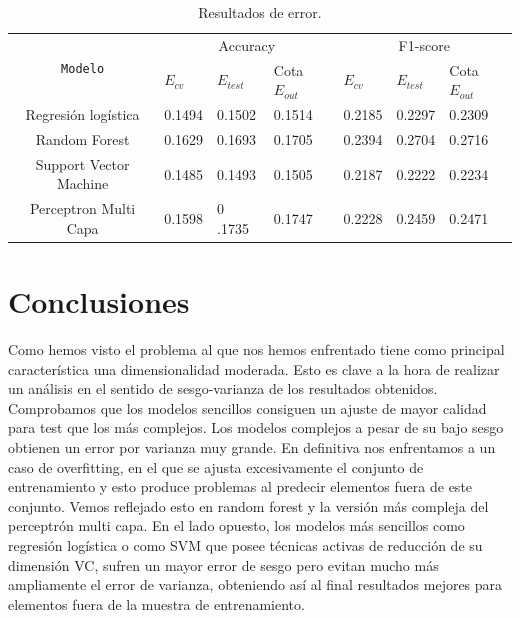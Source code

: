 \documentclass[11pt,a4paper]{article}
\begin{document}
\begin{table}[h]
  \begin{center}

\begin{tabular}{|c| lll| lll|}
\hline
  \multirow{2}{*}{\texttt{Modelo}} &     \multicolumn{3}{c|}{Accuracy}  &      \multicolumn{3}{c|}{F1-score} \\
          & $E_{cv}$&$E_{test}$& Cota $E_{out}$ &$E_{cv}$&$E_{test}$& Cota $E_{out}$ \\
\hline

  Regresión logística & 0.1494 & 0.1502 & 0.1514 & 0.2185 & 0.2297 & 0.2309 \\
  Random Forest & 0.1629 & 0.1693 & 0.1705 & 0.2394 & 0.2704 &0.2716 \\
  Support Vector Machine & 0.1485 & 0.1493 & 0.1505 & 0.2187 & 0.2222 & 0.2234 \\
  Perceptron Multi Capa & 0.1598 & 0 .1735 &0.1747 & 0.2228 & 0.2459 &0.2471  \\\hline

\end{tabular}
\end{center}
\caption{Resultados de error.}
\label{tab:table-name-error} 
\end{table}



\newpage
\section{ Conclusiones }
Como hemos visto el problema al que nos hemos enfrentado tiene como principal característica una dimensionalidad moderada. Esto es clave a la hora de realizar un análisis en el sentido de sesgo-varianza de los resultados obtenidos. Comprobamos que los modelos sencillos consiguen un ajuste de mayor calidad para test que los más complejos. Los modelos complejos a pesar de su bajo sesgo obtienen un error por varianza muy grande. En definitiva nos enfrentamos a un caso de overfitting, en el que se ajusta excesivamente el conjunto de entrenamiento y esto produce problemas al predecir elementos fuera de este conjunto. Vemos reflejado esto en random forest y la versión más compleja del perceptrón multi capa. En el lado opuesto, los modelos más sencillos como regresión logística o como SVM que posee técnicas activas de reducción de su dimensión VC, sufren un mayor error de sesgo pero evitan mucho más ampliamente el error de varianza, obteniendo así al final resultados mejores para elementos fuera de la muestra de entrenamiento. \\
\end{document}
